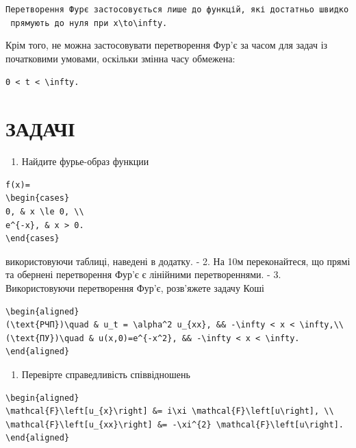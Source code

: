 \documentclass[
  ukrainian,
]{article}
\providecommand{\tightlist}{%
  \setlength{\itemsep}{0pt}\setlength{\parskip}{0pt}}
\begin{document}
\texttt{Перетворення\ Фур\textquotesingle{}є\ застосовується\ лише\ до\ функцій,\ які\ достатньо\ швидко\ прямують\ до\ нуля\ при\ \textquotesingle{}\textbar{}x\textbar{}\textbackslash{}to\textbackslash{}infty\textquotesingle{}.}

Крім того, не можна застосовувати перетворення Фур'є за часом для задач
із початковими умовами, оскільки змінна часу обмежена:

\begin{verbatim}
0 < t < \infty.
\end{verbatim}

\section{ЗАДАЧІ}\label{ux437ux430ux434ux430ux447ux456-1}

\begin{enumerate}
\def\labelenumi{\arabic{enumi}.}
\tightlist
\item
  Найдите фурье-образ функции
\end{enumerate}

\begin{verbatim}
f(x)=
\begin{cases}
0, & x \le 0, \\
e^{-x}, & x > 0.
\end{cases}
\end{verbatim}

використовуючи таблиці, наведені в додатку. - 2. На 10м переконайтеся,
що прямі та обернені перетворення Фур'є є лінійними перетвореннями. - 3.
Використовуючи перетворення Фур'є, розв'яжете задачу Коші

\begin{verbatim}
\begin{aligned}
(\text{РЧП})\quad & u_t = \alpha^2 u_{xx}, && -\infty < x < \infty,\\
(\text{ПУ})\quad & u(x,0)=e^{-x^2}, && -\infty < x < \infty.
\end{aligned}
\end{verbatim}

\begin{enumerate}
\def\labelenumi{\arabic{enumi}.}
\setcounter{enumi}{3}
\tightlist
\item
  Перевірте справедливість співвідношень
\end{enumerate}

\begin{verbatim}
\begin{aligned}
\mathcal{F}\left[u_{x}\right] &= i\xi \mathcal{F}\left[u\right], \\
\mathcal{F}\left[u_{xx}\right] &= -\xi^{2} \mathcal{F}\left[u\right].
\end{aligned}
\end{verbatim}
\end{document}
